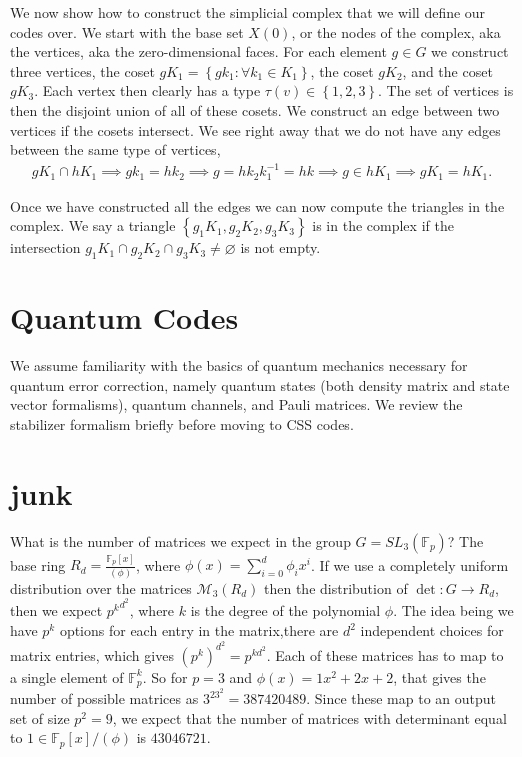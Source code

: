 \documentclass{article}
\newcommand{\set}[1]{\left\{ #1 \right\}}
\newcommand{\field}{\mathbb{F}}
\begin{document}
We now show how to construct the simplicial complex that we will define our codes over. We start with the base set $X(0)$, or the nodes of the complex, aka the vertices, aka the zero-dimensional faces. For each element $g \in G$ we construct three vertices, the coset $g K_1 = \set {g k_1 : \forall k_1 \in K_1}$, the coset $g K_2$, and the coset $g K_3$. Each vertex then clearly has a type $\tau(v) \in \set{1, 2, 3}$. The set of vertices is then the disjoint union of all of these cosets. We construct an edge between two vertices if the cosets intersect. We see right away that we do not have any edges between the same type of vertices,
\begin{align}
    g K_1 \cap h K_1 \implies g k_1 = h k_2 \implies g = h k_2 k_1^{-1} = h k \implies g \in h K_1 \implies g K_1 = h K_1.
\end{align}

Once we have constructed all the edges we can now compute the triangles in the complex. We say a triangle $\set{g_1 K_1, g_2 K_2, g_3 K_3}$ is in the complex if the intersection $g_1 K_1 \cap g_2 K_2 \cap g_3 K_3 \neq \varnothing$ is not empty. 


\section{Quantum Codes}
We assume familiarity with the basics of quantum mechanics necessary for quantum error correction, namely quantum states (both density matrix and state vector formalisms), quantum channels, and Pauli matrices. We review the stabilizer formalism briefly before moving to CSS codes.

\section{junk}
What is the number of matrices we expect in the group $G = SL_3(\field_p)$? The base ring $R_d = \frac{\field_p[x]}{(\phi)}$, where $\phi(x) = \sum_{i = 0}^d \phi_i x^i$. If we use a completely uniform distribution over the matrices $\mathcal{M}_{3}(R_d)$ then the distribution of $\det : G \to R_d$, then we expect ${p^k}^{d^2}$, where $k$ is the degree of the polynomial $\phi$. The idea being we have $p^{k}$ options for each entry in the matrix,there are $d^2$ independent choices for matrix entries, which gives $(p^{k})^{d^2} = p^{kd^2}$. Each of these matrices has to map to a single element of $\field_p^{k}$. So for $p = 3$ and $\phi(x) = 1 x^2 + 2 x + 2$, that gives the number of possible matrices as $3^{2 3^2} = 387420489$. Since these map to an output set of size $p^2 = 9$, we expect that the number of matrices with determinant equal to $1 \in \field_p[x] / (\phi)$ is $43046721$.
\end{document}
